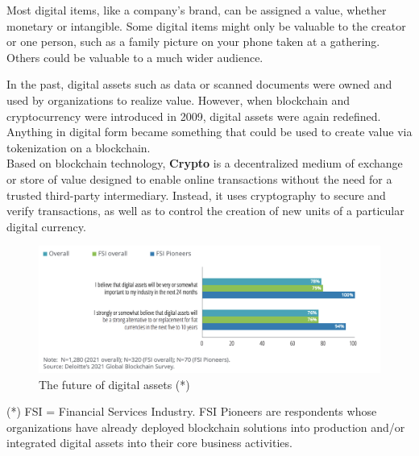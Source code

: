 \documentclass[MSE,Master,english]{twbook}%
\begin{document}
Most digital items, like a company's brand, can be assigned a value, whether monetary or intangible. Some digital items might only be valuable to the creator or one person, such as a family picture on your phone taken at a gathering. Others could be valuable to a much wider audience.

In the past, digital assets such as data or scanned documents were owned and used by organizations to realize value. However, when blockchain and cryptocurrency were introduced in 2009, digital assets were again redefined. Anything in digital form became something that could be used to create value via tokenization on a blockchain. \\

Based on blockchain technology, \textbf{\ac{Crypto}} is a decentralized medium of exchange or store of value designed to enable online transactions without the need for a trusted third-party intermediary. Instead, it uses cryptography to secure and verify transactions, as well as to control the creation of new units of a particular digital currency.\cite{crypto}

\begin{figure}[H]
  \centering
  \includegraphics[width=\textwidth]{digital_assets_future.png}
  \caption{The future of digital assets (*) \cite{blockchainSurvey}}
  \label{fig:digital_assets_future}
\end{figure}

(*) FSI = Financial Services Industry. FSI Pioneers are respondents whose organizations have already deployed blockchain solutions into production and/or integrated digital assets into their core business activities. \\
\end{document}
